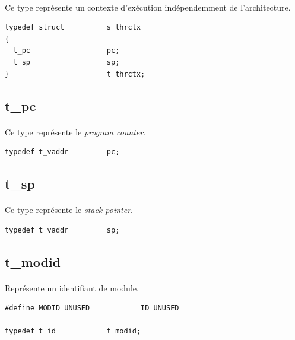 \documentclass[10pt,a4wide]{article}
\begin{document}
\paragraph{}

Ce type repr\'esente un contexte d'ex\'ecution ind\'ependemment de
l'architecture.

\begin{verbatim}
typedef struct          s_thrctx
{
  t_pc                  pc;
  t_sp                  sp;
}                       t_thrctx;
\end{verbatim}

\subsection{t\_pc}

\paragraph{}

Ce type repr\'esente le \textit{program counter}.

\begin{verbatim}
typedef t_vaddr         pc;
\end{verbatim}

\subsection{t\_sp}

\paragraph{}

Ce type repr\'esente le \textit{stack pointer}.

\begin{verbatim}
typedef t_vaddr         sp;
\end{verbatim}

\subsection{t\_modid}

\paragraph{}

Repr\'esente un identifiant de module.

\begin{verbatim}
#define MODID_UNUSED            ID_UNUSED

typedef t_id            t_modid;
\end{verbatim}
\end{document}
